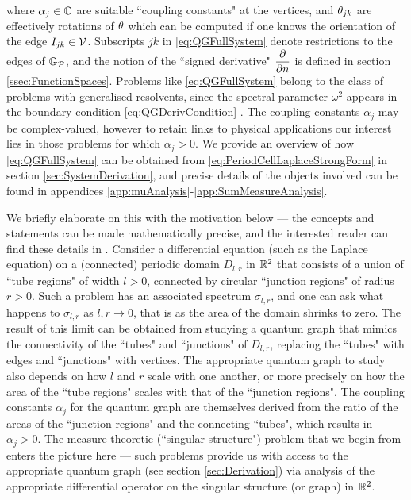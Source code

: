 where $\alpha_j\in\mathbb{C}$ are suitable ``coupling constants" at the vertices, and $\theta_{jk}$ are effectively rotations of $\theta$ which can be computed if one knows the orientation of the edge $I_{jk}\in\mathcal{V}$.
Subscripts $jk$ in \eqref{eq:QGFullSystem} denote restrictions to the edges of $\mathbb{G}_{\mathcal{P}}$, and the notion of the ``signed derivative" $\dfrac{\partial }{\partial n}$ is defined in section \ref{ssec:FunctionSpaces}.
Problems like \eqref{eq:QGFullSystem} belong to the class of problems with generalised resolvents, since the spectral parameter $\omega^2$ appears in the boundary condition \eqref{eq:QGDerivCondition} \cite{strauss1954generalized, strauss1968extensions, strauss1998functional, cherednichenko2018effective}.
The coupling constants $\alpha_j$ may be complex-valued, however to retain links to physical applications our interest lies in those problems for which $\alpha_j>0$.
We provide an overview of how \eqref{eq:QGFullSystem} can be obtained from \eqref{eq:PeriodCellLaplaceStrongForm} in section \ref{sec:SystemDerivation}, and precise details of the objects involved can be found in appendices \ref{app:muAnalysis}-\ref{app:SumMeasureAnalysis}.

We briefly elaborate on this with the motivation below --- the concepts and statements can be made mathematically precise, and the interested reader can find these details in .
Consider a differential equation (such as the Laplace equation) on a (connected) periodic domain $D_{l,r}$ in $\mathbb{R}^2$ that consists of a union of ``tube regions" of width $l>0$, connected by circular ``junction regions" of radius $r>0$.
Such a problem has an associated spectrum $\sigma_{l,r}$, and one can ask what happens to $\sigma_{l,r}$ as $l,r\rightarrow0$, that is as the area of the domain shrinks to zero.
The result of this limit can be obtained from studying a quantum graph that mimics the connectivity of the ``tubes" and ``junctions" of $D_{l,r}$, replacing the ``tubes" with edges and ``junctions" with vertices.
The appropriate quantum graph to study also depends on how $l$ and $r$ scale with one another, or more precisely on how the area of the ``tube regions" scales with that of the ``junction regions".
The coupling constants $\alpha_j$ for the quantum graph are themselves derived from the ratio of the areas of the ``junction regions" and the connecting ``tubes", which results in $\alpha_j> 0$.
The measure-theoretic (``singular structure") problem that we begin from enters the picture here --- such problems provide us with access to the appropriate quantum graph (see section \ref{sec:Derivation}) via analysis of the appropriate differential operator on the singular structure (or graph) in $\mathbb{R}^2$.